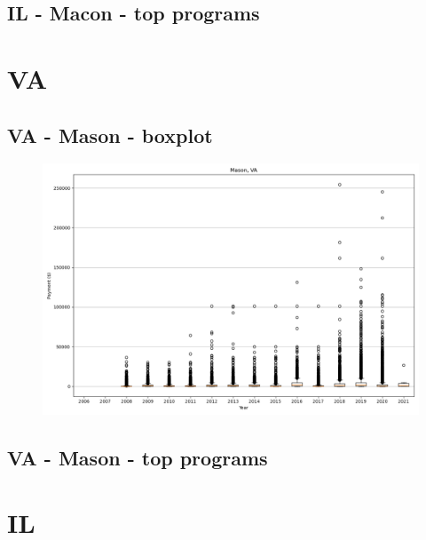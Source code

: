 \subsection*{IL - Macon - top programs}

\newpage
\section*{VA}
\subsection*{VA - Mason - boxplot}
\begin{figure}[h]
\centering
\includegraphics[width=7in]{../output/boxplots/counties/Mason-VA_boxplot.png}
\end{figure}


\subsection*{VA - Mason - top programs}

\newpage
\section*{IL}
